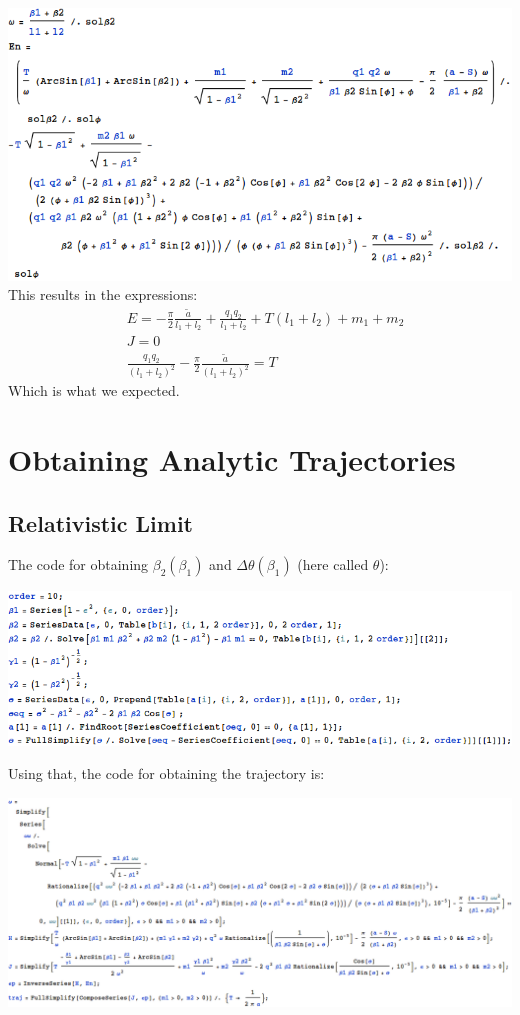 \documentclass[11pt,a4paper]{article}
\begin{document}
\includegraphics[width=\linewidth]{figures/nonrelativisticeq.png}
This results in the expressions:
\begin{subequations}
\begin{align}
&E=-\frac{\pi}{2}\frac{\tilde{a}}{l_1+l_2}+\frac{q_1 q_2}{l_1+l_2}+T (l_1+l_2)+m_1+m_2\\
&J=0\\
&\frac{q_1 q_2}{(l_1+l_2)^2}-\frac{\pi}{2}\frac{\tilde{a}}{(l_1+l_2)^2}=T
\end{align}
\end{subequations}
Which is what we expected.
\FloatBarrier
\section{Obtaining Analytic Trajectories}
\label{sec:analytic}
\subsection{Relativistic Limit}
The code for obtaining $\beta_2\left(\beta_1\right)$ and $\Delta\theta\left(\beta_1\right)$ (here called $\theta$):

\includegraphics[width=\linewidth]{figures/AnalyticRelativisticKin}

Using that, the code for obtaining the trajectory is:

\includegraphics[width=\linewidth]{figures/AnalyticRelativisticRegge}
\end{document}
